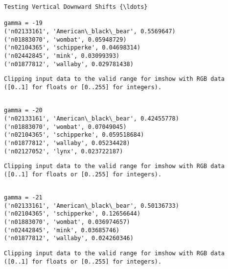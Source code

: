 \documentclass[11pt]{article}
\begin{document}
    \begin{Verbatim}[commandchars=\\\{\}]
Testing Vertical Downward Shifts {\ldots}

gamma = -19
('n02133161', 'American\_black\_bear', 0.5569647)
('n01883070', 'wombat', 0.05948729)
('n02104365', 'schipperke', 0.04698314)
('n02442845', 'mink', 0.03099393)
('n01877812', 'wallaby', 0.029781438)

    \end{Verbatim}

    \begin{Verbatim}[commandchars=\\\{\}]
Clipping input data to the valid range for imshow with RGB data ([0..1] for floats or [0..255] for integers).

    \end{Verbatim}

    \begin{Verbatim}[commandchars=\\\{\}]

gamma = -20
('n02133161', 'American\_black\_bear', 0.42455778)
('n01883070', 'wombat', 0.07049045)
('n02104365', 'schipperke', 0.059518684)
('n01877812', 'wallaby', 0.05234428)
('n02127052', 'lynx', 0.023722187)

    \end{Verbatim}

    \begin{Verbatim}[commandchars=\\\{\}]
Clipping input data to the valid range for imshow with RGB data ([0..1] for floats or [0..255] for integers).

    \end{Verbatim}

    \begin{Verbatim}[commandchars=\\\{\}]

gamma = -21
('n02133161', 'American\_black\_bear', 0.50136733)
('n02104365', 'schipperke', 0.12656644)
('n01883070', 'wombat', 0.036974657)
('n02442845', 'mink', 0.03685746)
('n01877812', 'wallaby', 0.024260346)

    \end{Verbatim}

    \begin{Verbatim}[commandchars=\\\{\}]
Clipping input data to the valid range for imshow with RGB data ([0..1] for floats or [0..255] for integers).

    \end{Verbatim}
\end{document}
